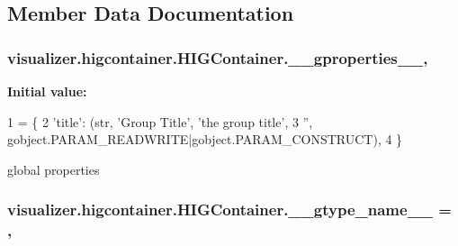 \subsection{Member Data Documentation}
\subsubsection[{\texorpdfstring{\+\_\+\+\_\+gproperties\+\_\+\+\_\+}{__gproperties__}}]{\setlength{\rightskip}{0pt plus 5cm}visualizer.\+higcontainer.\+H\+I\+G\+Container.\+\_\+\+\_\+gproperties\+\_\+\+\_\+\hspace{0.3cm}{\ttfamily [static]}, {\ttfamily [private]}}\hypertarget{classvisualizer_1_1higcontainer_1_1HIGContainer_a8e4a49730c2f9e8656954053de34b88a}{}\label{classvisualizer_1_1higcontainer_1_1HIGContainer_a8e4a49730c2f9e8656954053de34b88a}
{\bfseries Initial value\+:}
\begin{DoxyCode}
1 = \{
2         \textcolor{stringliteral}{'title'}: (str, \textcolor{stringliteral}{'Group Title'}, \textcolor{stringliteral}{'the group title'},
3                   \textcolor{stringliteral}{''}, gobject.PARAM\_READWRITE|gobject.PARAM\_CONSTRUCT),
4     \}
\end{DoxyCode}


global properties 

\subsubsection[{\texorpdfstring{\+\_\+\+\_\+gtype\+\_\+name\+\_\+\+\_\+}{__gtype_name__}}]{\setlength{\rightskip}{0pt plus 5cm}visualizer.\+higcontainer.\+H\+I\+G\+Container.\+\_\+\+\_\+gtype\+\_\+name\+\_\+\+\_\+ = \textquotesingle{}\hspace{0.3cm}{\ttfamily [static]}, {\ttfamily [private]}}\hypertarget{classvisualizer_1_1higcontainer_1_1HIGContainer_a9f05df0b48acf6809b31fe11165c6008}{}\label{classvisualizer_1_1higcontainer_1_1HIGContainer_a9f05df0b48acf6809b31fe11165c6008}


